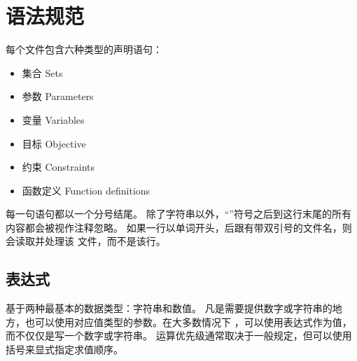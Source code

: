 
\section{语法规范}

每个\zpl 文件包含六种类型的声明语句：
\begin{itemize}
\setlength{\itemsep}{0pt}%
\item 集合 Sets
\item 参数 Parameters
\item 变量 Variables
\item 目标 Objective
\item 约束 Constraints
\item 函数定义 Function definitions
\end{itemize}
%
每一句语句都以一个分号结尾。
除了字符串以外，“\code{\#}”符号之后到这行末尾的所有内容都会被视作注释忽略。
如果一行以单词开头，后跟有带双引号的文件名，则会读取并处理该
文件，而不是该行。

\subsection{表达式}
\zimpl 基于两种最基本的数据类型：字符串和数值。
凡是需要提供数字或字符串的地方，也可以使用对应值类型的参数。在大多数情况下
，可以使用表达式作为值，而不仅仅是写一个数字或字符串。
运算优先级通常取决于一般规定，但可以使用括号来显式指定求值顺序。

